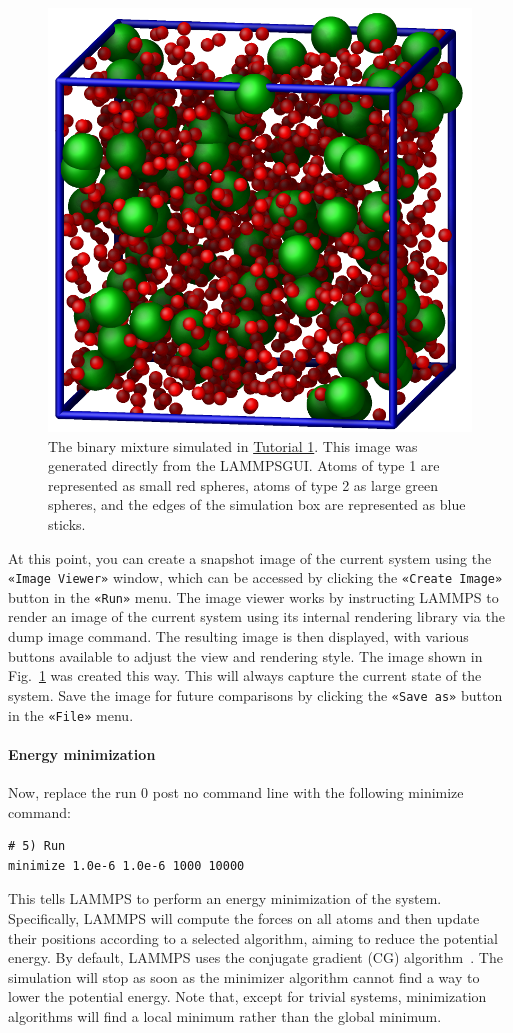 \documentclass[9pt,tutorial]{livecoms}
\newcommand{\lmpcmd}[1]{\hspace{0pt}\colorbox{listing}{\textcolor{command}{\small{#1}}}\hspace{0pt}} %
\newcommand{\guicmd}[1]{\textcolor{command}{\texttt{«#1»}}} %
\newcommand{\lammpsgui}{\textsf{LAMMPS\textendash GUI}}
\begin{document}
\begin{figure}
\centering
\includegraphics[width=0.55\linewidth]{LJ}
\caption{The binary mixture simulated in \hyperref[lennard-jones-label]{Tutorial 1}.
  This image was generated directly from the \lammpsgui{}.  Atoms of
  type 1 are represented as small red spheres, atoms of type 2 as large
  green spheres, and the edges of the simulation box are represented as blue sticks.}
\label{fig:LJ}
\end{figure}

At this point, you can create a snapshot image of the current system
using the \guicmd{Image Viewer} window, which can be accessed by
clicking the \guicmd{Create Image} button in the \guicmd{Run} menu.  The
image viewer works by instructing LAMMPS to render an image of the
current system using its internal rendering library via the \lmpcmd{dump
  image} command.  The resulting image is then displayed, with various
buttons available to adjust the view and rendering style.  The image
shown in Fig.~\ref{fig:LJ} was created this way.  This will always
capture the current state of the system.  Save the image for future
comparisons {\color{blue}by clicking the \guicmd{Save as} button 
in the \guicmd{File} menu}.

\paragraph{Energy minimization}

Now, replace the \lmpcmd{run 0 post no} command line with the
following \lmpcmd{minimize} command:
\begin{lstlisting}
# 5) Run
minimize 1.0e-6 1.0e-6 1000 10000
\end{lstlisting}
This tells LAMMPS to perform an energy minimization of the system.
Specifically, LAMMPS will compute the forces on all atoms and then update their
positions according to a selected algorithm, aiming to reduce
the potential energy.  By default, LAMMPS uses the conjugate gradient (CG)
algorithm~\cite{hestenes1952methods}.  The simulation will stop as soon
as the minimizer algorithm cannot find a way to lower the potential
energy. %
Note that, except for trivial systems, minimization algorithms will find a
local minimum rather than the global minimum.
\end{document}
